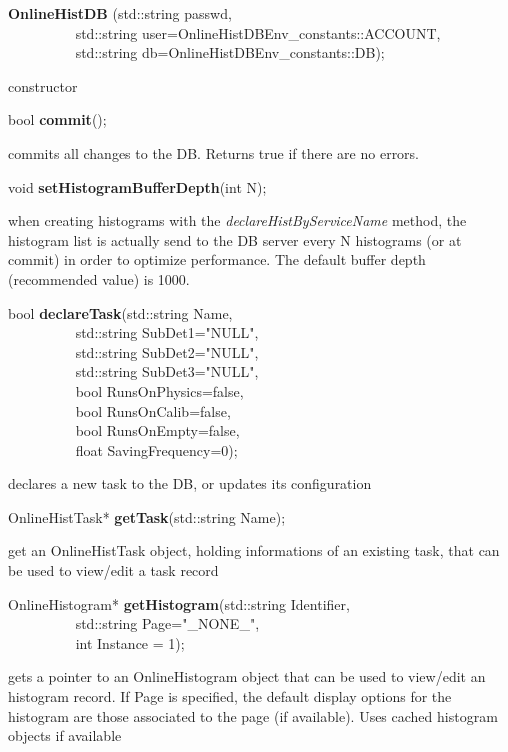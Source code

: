\item    {\bf OnlineHistDB }(std::string passwd,\\\mbox{}~~~~~~~~~ 
		std::string user=OnlineHistDBEnv\_constants::ACCOUNT,\\\mbox{}~~~~~~~~~ 
		std::string db=OnlineHistDBEnv\_constants::DB);

 constructor


\item    bool {\bf commit}();


 commits all changes to the DB. Returns true if there are no errors.


\item    void {\bf setHistogramBufferDepth}(int N);


 when creating histograms with the {\it declareHistByServiceName}
 method, the histogram list is actually send to the DB server every N
 histograms (or at commit) in order to optimize performance. The
 default buffer depth (recommended value) is 1000. 


\item    bool {\bf declareTask}(std::string Name,\\\mbox{}~~~~~~~~~ 
		   std::string SubDet1="NULL",\\\mbox{}~~~~~~~~~ 
		   std::string SubDet2="NULL",\\\mbox{}~~~~~~~~~ 
		   std::string SubDet3="NULL",\\\mbox{}~~~~~~~~~
		   bool RunsOnPhysics=false,\\\mbox{}~~~~~~~~~ 
		   bool RunsOnCalib=false,\\\mbox{}~~~~~~~~~ 
		   bool RunsOnEmpty=false,\\\mbox{}~~~~~~~~~
		   float SavingFrequency=0);

 declares a new task to the DB, or updates its configuration 


\item    OnlineHistTask* {\bf getTask}(std::string Name);


 get an OnlineHistTask object, holding informations of an existing task, that can be used to view/edit a task record


\item    OnlineHistogram* {\bf getHistogram}(std::string Identifier,\\\mbox{}~~~~~~~~~
				std::string Page="\_NONE\_",\\\mbox{}~~~~~~~~~
				int Instance = 1);

 gets a pointer to an OnlineHistogram object that can be used to view/edit an histogram record. If Page
 is specified, the default display options for the histogram are those associated to the page (if available).
 Uses cached histogram objects if available


